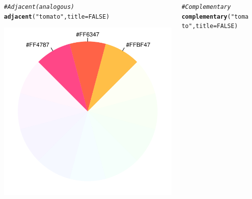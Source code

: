 \documentclass[12pt]{beamer}\usepackage[]{graphicx}\usepackage[]{color}
\makeatletter
\newcommand{\hlnum}[1]{\textcolor[rgb]{0.686,0.059,0.569}{#1}}%
\newcommand{\hlstr}[1]{\textcolor[rgb]{0.192,0.494,0.8}{#1}}%
\newcommand{\hlcom}[1]{\textcolor[rgb]{0.678,0.584,0.686}{\textit{#1}}}%
\newcommand{\hlstd}[1]{\textcolor[rgb]{0.345,0.345,0.345}{#1}}%
\newcommand{\hlkwc}[1]{\textcolor[rgb]{0.333,0.667,0.333}{#1}}%
\newcommand{\hlkwd}[1]{\textcolor[rgb]{0.737,0.353,0.396}{\textbf{#1}}}%
\newenvironment{kframe}{%
 \def\at@end@of@kframe{}%
 \ifinner\ifhmode%
  \def\at@end@of@kframe{\end{minipage}}%
  \begin{minipage}{\columnwidth}%
 \fi\fi%
 \def\FrameCommand##1{\hskip\@totalleftmargin \hskip-\fboxsep
 \colorbox{shadecolor}{##1}\hskip-\fboxsep
     \hskip-\linewidth \hskip-\@totalleftmargin \hskip\columnwidth}%
 \MakeFramed {\advance\hsize-\width
   \@totalleftmargin\z@ \linewidth\hsize
   \@setminipage}}%
 {\par\unskip\endMakeFramed%
 \at@end@of@kframe}
\newenvironment{knitrout}{}{} %
\makeatother
\begin{document}
\begin{frame}[fragile]

\begin{columns}[t]
\begin{column}{0.5\textwidth}
\begin{knitrout}\tiny
{}\color{fgcolor}\begin{kframe}
\begin{alltt}
\hlcom{# Adjacent (analogous)}
\hlkwd{adjacent}\hlstd{(}\hlstr{"tomato"}\hlstd{,} \hlkwc{title} \hlstd{=} \hlnum{FALSE}\hlstd{)}
\end{alltt}
\end{kframe}

{\centering \includegraphics[width=.6\linewidth,height=.6\linewidth]{figure/tomato_adjacent-1} 

}



\end{knitrout}
\end{column}

\begin{column}{0.5\textwidth}
\begin{knitrout}\tiny
{}\color{fgcolor}\begin{kframe}
\begin{alltt}
\hlcom{# Complementary}
\hlkwd{complementary}\hlstd{(}\hlstr{"tomato"}\hlstd{,} \hlkwc{title} \hlstd{=} \hlnum{FALSE}\hlstd{)}
\end{alltt}
\end{kframe}


\end{knitrout}
\end{column}
\end{columns}
\end{frame}
\end{document}
